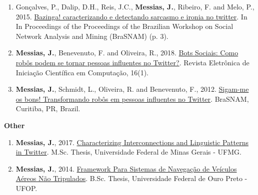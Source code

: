 \begin{enumerate}
    \item Gonçalves, P., Dalip, D.H., Reis, J.C., \textbf{Messias, J.}, Ribeiro, F. and Melo, P., 2015. \href{https://people.mpi-sws.org/~johnme/pdf/goncalves_brasnam15.pdf}{Bazinga! caracterizando e detectando sarcasmo e ironia no twitter}. In In Proceedings of the Proceedings of the Brazilian Workshop on Social Network Analysis and Mining (BraSNAM) (p. 3).
    \item \textbf{Messias, J.}, Benevenuto, F. and Oliveira, R., 2018. \href{https://people.mpi-sws.org/~johnme/pdf/messias_ctic13.pdf}{Bots Sociais: Como robôs podem se tornar pessoas influentes no Twitter?}. Revista Eletrônica de Iniciação Científica em Computação, 16(1).
    \item \textbf{Messias, J.}, Schmidt, L., Oliveira, R. and Benevenuto, F., 2012. \href{https://people.mpi-sws.org/~johnme/pdf/messias-brasnam12.pdf}{Sigam-me os bons! Transformando robôs em pessoas influentes no Twitter}. BraSNAM, Curitiba, PR, Brazil.

\end{enumerate}

\textbf{Other}

\begin{enumerate}
    \item \textbf{Messias, J.}, 2017. \href{https://people.mpi-sws.org/~johnme/pdf/master-thesis_johnnatan_messias.pdf}{Characterizing Interconnections and Linguistic Patterns in Twitter}. M.Sc. Thesis, Universidade Federal de Minas Gerais - UFMG.
    \item \textbf{Messias, J.}, 2014. \href{https://people.mpi-sws.org/~johnme/pdf/mono_johnnatan_messias-15.pdf}{Framework Para Sistemas de Navegação de Veículos Aéreos Não Tripulados}. B.Sc. Thesis, Universidade Federal de Ouro Preto - UFOP.

\end{enumerate}


